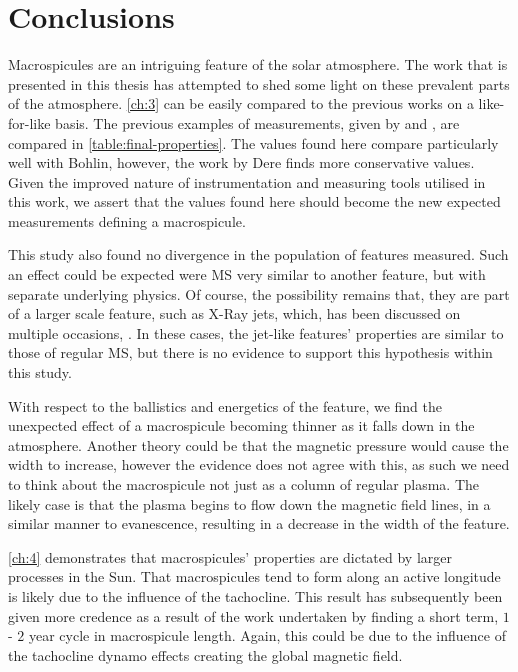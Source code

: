 
\label{ch:conc}
\chapter{Conclusions}

Macrospicules are an intriguing feature of the solar atmosphere.
The work that is presented in this thesis has attempted to shed some light on these prevalent parts of the atmosphere.
\cref{ch:3} can be easily compared to the previous works on a like-for-like basis.
The previous examples of measurements, given by \cite{Bohlin1975} and \cite{Dere89}, are compared in \cref{table:final-properties}.
The values found here compare particularly well with Bohlin, however, the work by Dere finds more conservative values.
Given the improved nature of instrumentation and measuring tools utilised in this work, we assert that the values found here should become the new expected measurements defining a macrospicule.

This study also found no divergence in the population of features measured.
Such an effect could be expected were MS very similar to another feature, but with separate underlying physics.
Of course, the possibility remains that, they are part of a larger scale feature, such as X-Ray jets, which, has been discussed on multiple occasions, \cite{Parenti2002, Kamio2010}.
In these cases, the jet-like features' properties are similar to those of regular MS, but there is no evidence to support this hypothesis within this study.   

With respect to the ballistics and energetics of the feature, we find the unexpected effect of a macrospicule becoming thinner as it falls down in the atmosphere.
Another theory could be that the magnetic pressure would cause the width to increase, however the evidence does not agree with this, as such we need to think about the macrospicule not just as a column of regular plasma.
The likely case is that the plasma begins to flow down the magnetic field lines, in a similar manner to evanescence, resulting in a decrease in the width of the feature.

\cref{ch:4} demonstrates that macrospicules' properties are dictated by larger processes in the Sun.
That macrospicules tend to form along an active longitude is likely due to the influence of the tachocline.
This result has subsequently been given more credence as a result of the work undertaken by \cite{Kiss2017} finding a short term, $1$ - $2$ year cycle in macrospicule length.
Again, this could be due to the influence of the tachocline dynamo effects creating the global magnetic field.

